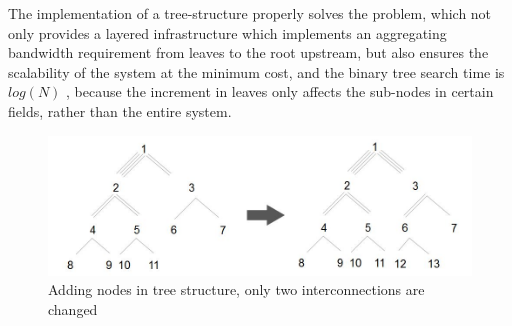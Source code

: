 \documentclass[11pt,openright,a4paper]{report}
\begin{document}
The implementation of a tree-structure properly solves the problem, which not only provides a layered infrastructure which implements an aggregating bandwidth requirement from leaves to the root upstream, but also ensures the scalability of the system at the minimum cost, and the binary tree search time is $log(N)$ \cite{ellis1980concurrent}, because the increment in leaves only affects the sub-nodes in certain fields, rather than the entire system.\\
\begin{figure}[H]
	\centering
    \includegraphics[width=0.6\linewidth]{picture/tree_addNodes.jpg}
    \caption{Adding nodes in tree structure, only two interconnections are changed}
    \label{fig:addnode}
\end{figure}
\end{document}
